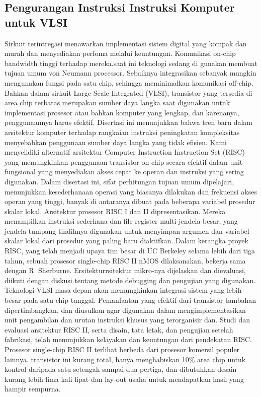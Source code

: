 	\subsection{Pengurangan Instruksi Instruksi Komputer untuk VLSI}

	Sirkuit terintregasi menawarkan implementasi sistem digital yang kompak dan murah dan menyediakan perfoma melalui keuntungan. 
	Komunikasi on-chip bandwidth tinggi terhadap mereka.saat ini teknologi sedang di gunakan membuat tujuan umum von Neumann processor. 
	Sebaiknya integrasikan sebanyak mungkin mengunakan fungsi pada satu chip, sehingga meminimalkan komunikasi off-chip.
	Bahkan dalam sirkuit Large Scale Integrated (VLSI), transistor yang tersedia di area chip terbatas merupakan sumber daya langka saat digunakan untuk implementasi prosesor atau bahkan komputer yang lengkap, dan karenanya, penggunaannya harus efektif.
	Disertasi ini menunjukkan bahwa tren baru dalam arsitektur komputer terhadap rangkaian instruksi peningkatan kompleksitas menyebabkan penggunaan sumber daya langka yang tidak efisien.
	Kami menyelidiki alternatif arsitektur Computer Instruction Instruction Set (RISC) yang memungkinkan penggunaan transistor on-chip secara efektif dalam unit fungsional yang menyediakan akses cepat ke operan dan instruksi yang sering digunakan.
	Dalam disertasi ini, sifat perhitungan tujuan umum dipelajari, menunjukkan kesederhanaan operasi yang biasanya dilakukan dan frekuensi akses operan yang tinggi, banyak di antaranya dibuat pada beberapa variabel prosedur skalar lokal. 
	Arsitektur prosesor RISC I dan II dipresentasikan. Mereka menampilkan instruksi sederhana dan file register multi-jendela besar, yang jendela tumpang tindihnya digunakan untuk menyimpan argumen dan variabel skalar lokal dari prosedur yang paling baru diaktifkan. 
	Dalam kerangka proyek RISC, yang telah menjadi upaya tim besar di UC Berkeley selama lebih dari tiga tahun, sebuah prosesor single-chip RISC II nMOS dilaksanakan, bekerja sama dengan R. Sherburne. 
	Ersitekturrsitektur mikro-nya dijelaskan dan dievaluasi, diikuti dengan diskusi tentang metode debugging dan pengujian yang digunakan. Teknologi VLSI masa depan akan memungkinkan integrasi sistem yang lebih besar pada satu chip tunggal.
	Pemanfaatan yang efektif dari transistor tambahan dipertimbangkan, dan diusulkan agar digunakan dalam mengimplementasikan unit pengambilan dan urutan instruksi khusus yang terorganisir dan.
	Studi dan evaluasi arsitektur RISC II, serta disain, tata letak, dan pengujian setelah fabrikasi, telah menunjukkan kelayakan dan keuntungan dari pendekatan RISC. Prosesor single-chip RISC II terlihat berbeda dari prosesor komersil populer lainnya.
	transistor ini kurang total, hanya menghabiskan 10\% area chip untuk kontrol daripada satu setengah sampai dua pertiga, dan dibutuhkan desain kurang lebih lima kali lipat dan lay-out usaha untuk mendapatkan hasil yang hampir sempurna.\cite{katevenis1983reduced}

